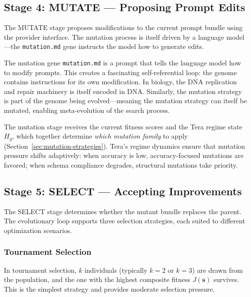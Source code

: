 \subsection{Stage 4: MUTATE --- Proposing Prompt Edits}

The MUTATE stage proposes modifications to the current prompt bundle using the provider interface. The mutation process is itself driven by a language model---the \texttt{mutation.md} gene instructs the model how to generate edits.

\begin{keyinsight}
The mutation gene \texttt{mutation.md} is a prompt that tells the language model how to modify prompts. This creates a fascinating self-referential loop: the genome contains instructions for its own modification. In biology, the DNA replication and repair machinery is itself encoded in DNA. Similarly, the mutation strategy is part of the genome being evolved---meaning the mutation strategy can itself be mutated, enabling meta-evolution of the search process.
\end{keyinsight}

The mutation stage receives the current fitness scores and the Tera regime state $H_g$, which together determine \emph{which mutation family} to apply (Section~\ref{sec:mutation-strategies}). Tera's regime dynamics ensure that mutation pressure shifts adaptively: when accuracy is low, accuracy-focused mutations are favored; when schema compliance degrades, structural mutations take priority.

\subsection{Stage 5: SELECT --- Accepting Improvements}

The SELECT stage determines whether the mutant bundle replaces the parent. The evolutionary loop supports three selection strategies, each suited to different optimization scenarios.

\subsubsection{Tournament Selection}

In tournament selection, $k$ individuals (typically $k = 2$ or $k = 3$) are drawn from the population, and the one with the highest composite fitness $J(\mathbf{s})$ survives. This is the simplest strategy and provides moderate selection pressure.

